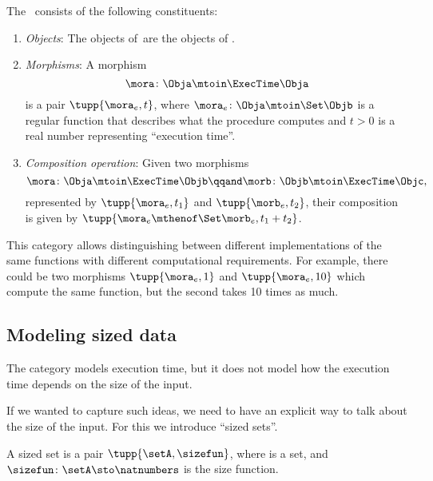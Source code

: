 \begin{definition}
    \label{def:ExecTime}
    The ~\ExecTime consists of the following constituents:
    \begin{enumerate}
        \item \emph{Objects}: The objects of~\ExecTime are the objects of \Set.
        \item \emph{Morphisms}: A morphism
              \begin{equation}
                  \mora \colon \Obja \mtoin\ExecTime \Obja
              \end{equation}
              is a pair $\tupp{\mora_e, t}$, where $\mora_e \colon \Obja \mtoin\Set \Objb$ is a regular function that describes what the procedure computes and $t>0$ is a real number representing ``execution time''.
        \item \emph{Composition operation}: Given two morphisms
              \begin{equation}
                  \mora \colon  \Obja\mtoin\ExecTime \Objb \qqand
                  \morb \colon  \Objb\mtoin\ExecTime \Objc,
              \end{equation}
              represented by $\tupp{\mora_e, t_1}$ and $\tupp{\morb_e, t_2}$, their composition is given by $\tupp{\mora_e\mthenof\Set\morb_e, t_1 + t_2 }$.
    \end{enumerate}
\end{definition}

This category allows distinguishing between different implementations of the same functions with different computational requirements.
For example, there could be two morphisms $\tupp{\mora_e, 1}$ and $\tupp{\mora_e, 10}$ which compute the same function, but the second takes 10 times as much.

\subsection{Modeling sized data}

The category \ExecTime models execution time, but it does not model how the execution time depends on the size of the input.

If we wanted to capture such ideas, we need to have an explicit way to talk about the size of the input.
%
For this we introduce ``sized sets''.

\begin{definition}
    \label{def:sized-set}
    A sized set is a pair $\tupp{\setA, \sizefun}$, where \setA is a set, and
    $\sizefun \colon \setA \sto \natnumbers$ is the size function.
\end{definition}

